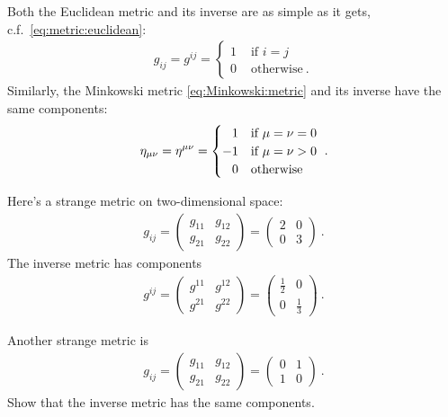 \documentclass[12pt, oneside]{report}    %
\begin{document}
\begin{example}
Both the Euclidean metric and its inverse are as simple as it gets, c.f.\ \eqref{eq:metric:euclidean}:
\begin{align}
    g_{ij} = g^{ij} =
    \begin{cases}
        1 &\text{ if } i = j \\
        0 &\text{ otherwise} \ .
    \end{cases}
    \label{eq:metric:and:inverseeuclidean}
\end{align}
Similarly, the Minkowski metric \eqref{eq:Minkowski:metric} and its inverse have the same components:
\begin{align}
    \eta_{\mu\nu}
    = \eta^{\mu\nu}
    =
    \begin{cases}
    \pp 1 & \text{if } \mu=\nu = 0\\
    -1 & \text{if } \mu=\nu > 0\\
    \pp 0 & \text{otherwise}
    \end{cases} \ .
    \label{eq:Minkowski:metric:and:inverse}
\end{align}
\end{example}
\begin{example}
Here's a strange metric on two-dimensional space:
\begin{align}
    g_{ij} =
    \begin{pmatrix}
        g_{11} & g_{12}\\
        g_{21} & g_{22}
    \end{pmatrix}
    =
    \begin{pmatrix}
        2 & 0\\
        0 & 3
    \end{pmatrix} \ .
\end{align}
The inverse metric has components
\begin{align}
    g^{ij} =
    \begin{pmatrix}
        g^{11} & g^{12}\\
        g^{21} & g^{22}
    \end{pmatrix}
    =
    \begin{pmatrix}
        \frac{1}{2} & 0\\
        0 & \frac{1}{3}
    \end{pmatrix} \ .
\end{align}
\end{example}
\begin{exercise}
Another strange metric is 
\begin{align}
    g_{ij} =
    \begin{pmatrix}
        g_{11} & g_{12}\\
        g_{21} & g_{22}
    \end{pmatrix}
    =
    \begin{pmatrix}
        0 & 1\\
        1 & 0
    \end{pmatrix} \ .
\end{align}
Show that the inverse metric has the same components. 
\end{exercise}
\end{document}
